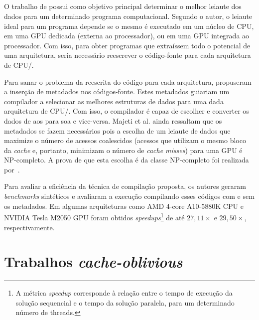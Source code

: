 \subsection{}

O trabalho de  possui como objetivo principal determinar o melhor leiaute dos dados para um determinado programa computacional. Segundo o autor, o leiaute ideal para um programa depende se o mesmo é executado em um núcleo de CPU, em uma GPU dedicada (externa ao processador), ou em uma GPU integrada ao processador. Com isso, para obter programas que extraíssem todo o potencial de uma arquitetura, seria necessário reescrever o código-fonte para cada arquitetura de CPU\@/\@GPU.

Para sanar o problema da reescrita do código para cada arquitetura,  propuseram a inserção de metadados nos códigos-fonte. Estes metadados guiariam um compilador a selecionar as melhores estruturas de dados para uma dada arquitetura de CPU\@/\@GPU. Com isso, o compilador é capaz de escolher e converter os dados de \ac{aos} para \ac{soa} e vice-versa.
Majeti et al. ainda ressaltam que os metadados se fazem necessários pois a escolha de um leiaute de dados que maximize o número de acessos coalescidos (acessos que utilizam o mesmo bloco da \textit{cache} e, portanto, minimizam o número de \textit{cache misses}) para uma GPU é NP-completo. A prova de que esta escolha é da classe NP-completo foi realizada por~.


Para avaliar a eficiência da técnica de compilação proposta, os autores geraram \textit{benchmarks} sintéticos e avaliaram a execução compilando esses códigos com e sem os metadados. Em algumas arquiteturas como AMD 4-core A10-5880K CPU e NVIDIA Tesla M2050 GPU foram obtidos \textit{speedups}\footnote{A métrica \textit{speedup} corresponde à relação entre o tempo de execução da solução sequencial e o tempo da solução paralela, para um determinado número de threads.} de até $27,11 \times$ e $29,50 \times$, respectivamente.

\section{Trabalhos \textit{cache-oblivious}}
\label{sec:trabalhos_cache_oblivous}

